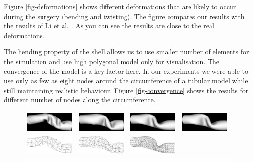 Figure \ref{fig-deformations} shows different deformations that are likely to
occur during the surgery (bending and twisting). The figure compares our
results with the results of Li et al. \cite{Li2009}. As you can see the
results are close to the real deformations.

The bending property of the shell allows us to use smaller number of
elements for the simulation and use high polygonal model only for
visualisation. The convergence of the model is a key factor here. In our
experiments we were able to use only as few as eight nodes around the
circumference of a tubular model while still maintaining realistic
behaviour. Figure \ref{fig-convergence} shows the results for different
number of nodes along the circumference.

\begin{figure}[tbh]
  \centering
  \begin{tabular}{cccc}
    \includegraphics[width=0.24\columnwidth]{img/twist-06-cg.png}
    &
    \includegraphics[width=0.24\columnwidth]{img/twist-08-cg.png}
    &
    \includegraphics[width=0.24\columnwidth]{img/twist-16-cg.png}
    &
    \includegraphics[width=0.24\columnwidth]{img/twist-31-cg.png}
    \\
    \includegraphics[width=0.24\columnwidth]{img/twist-06w-cg.png}
    &
    \includegraphics[width=0.24\columnwidth]{img/twist-08w-cg.png}
    &
    \includegraphics[width=0.24\columnwidth]{img/twist-16w-cg.png}

\end{tabular}
\end{figure}
